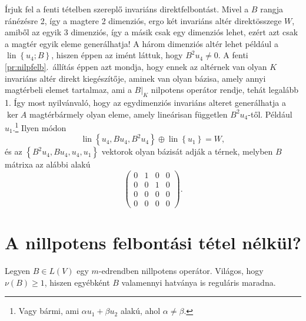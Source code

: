 \documentclass[9pt, a4paper, showtrims]{memoir}
\theoremstyle{plain}
\theoremstyle{remark}
\theoremstyle{definition}
\DeclareMathOperator{\lin}{lin}
\begin{document}
Írjuk fel a fenti tételben szereplő invariáns direktfelbontást.
Mivel a $B$ rangja ránézésre 2, így a magtere 2 dimenziós, ergo két invariáns altér direktösszege $W$, amiből
az egyik 3 dimenziós, így a másik csak egy dimenziós lehet, ezért azt csak a magtér egyik eleme generálhatja!
A három dimenziós altér lehet például a $\lin\left\{ u_4;B \right\}$, 
hiszen éppen az imént láttuk, hogy $B^2u_4\neq 0$.
A fenti \ref{pr:nilpfelb}.~állítás éppen azt mondja, hogy ennek az altérnek van olyan $K$ invariáns altér direkt kiegészítője, 
aminek van olyan bázisa, amely annyi magtérbeli elemet tartalmaz, ami a $B|_K$ nilpotens operátor rendje, tehát legalább 1.
Így most nyilvánvaló, hogy az
egydimenziós invariáns alteret generálhatja a $\ker A$ magtérbármely olyan eleme,
amely lineárisan független $B^2u_4$-től.
Például $u_1$.\footnote{Vagy bármi, ami $\alpha u_1+\beta u_2$ alakú, ahol $\alpha\neq\beta$.}
Ilyen módon
\[
    \lin\left\{ u_4,Bu_4,B^2u_4 \right\}\oplus
    \lin\left\{ u_1 \right\}
    =
    W,
\]
és az 
\(
\left\{ 
    B^2u_4,Bu_4,u_4,u_1
\right\}
\)
vektorok olyan bázisát adják a térnek, melyben $B$ mátrixa az alábbi alakú
\[
    \begin{pmatrix}
        0&1&0&0\\
        0&0&1&0\\
        0&0&0&0\\
        0&0&0&0
    \end{pmatrix}.
\]
\section{A nillpotens felbontási tétel nélkül?}
Legyen $B\in L\left( V \right)$ egy $m$-edrendben nillpotens operátor.
Világos, hogy $\nu\left( B \right)\geq 1$, 
hiszen egyébként $B$ valamennyi hatványa is reguláris maradna.
\end{document}
